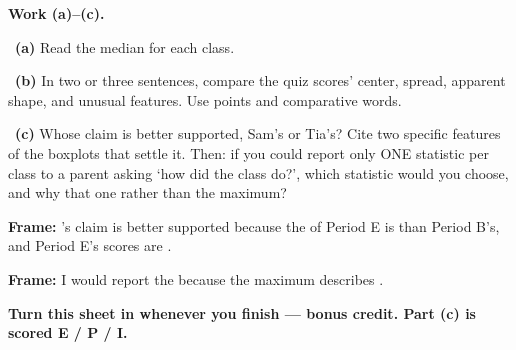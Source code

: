 \documentclass[11pt]{article}
\begin{document}
\newpage
\textbf{Work (a)--(c).}\par\smallskip

~\textbf{(a)} Read the median for each class.\par
\workspace{0.6in}

~\textbf{(b)} In two or three sentences, compare the quiz scores' center, spread, apparent shape, and unusual features. Use points and comparative words.\par
\workspace{1.5in}

~\textbf{(c)} Whose claim is better supported, Sam's or Tia's? Cite two specific features of the boxplots that settle it. Then: if you could report only ONE statistic per class to a parent asking `how did the class do?', which statistic would you choose, and why that one rather than the maximum?\par
\workspace{2.0in}

\begin{sentenceframebox}\raggedright\textbf{Frame:} \blank[0.8in]'s claim is better supported because the \blank[1in] of Period E is \blank[0.8in] than Period B's, and Period E's scores are \blank[1in].\end{sentenceframebox}

\begin{sentenceframebox}\raggedright\textbf{Frame:} I would report the \blank[0.9in] because the maximum describes \blank[1.6in].\end{sentenceframebox}

\textbf{Turn this sheet in whenever you finish --- bonus credit. Part (c) is scored E / P / I.}\par

\end{document}
